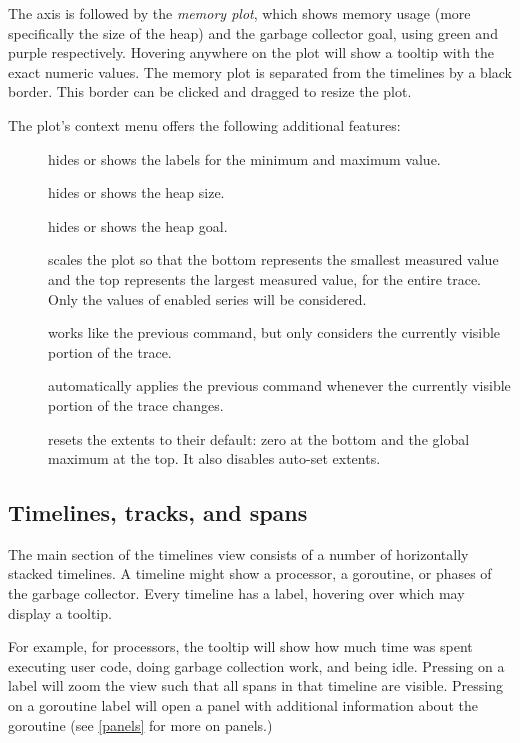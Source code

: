 \documentclass[10pt,letterpaper,oneside,openany,english]{memoir}
\newcommand{\noun}[1]{{\emph{#1}}}
\newcommand{\shortcut}{\ctrl{} or \cmdmac}
\begin{document}
The axis is followed by the \noun{memory plot}, which shows memory usage (more specifically the size of the heap) and the garbage collector goal, using green and purple respectively.
Hovering anywhere on the plot will show a tooltip with the exact numeric values.
The memory plot is separated from the timelines by a black border.
This border can be clicked and dragged to resize the plot.

The plot's context menu offers the following additional features:

\begin{description}
\item[] hides or shows the labels for the minimum and maximum value.
\item[] hides or shows the heap size.
\item[] hides or shows the heap goal.
\item[] scales the plot so that the bottom represents the smallest measured value and the top represents the largest measured value, for the entire trace.
  Only the values of enabled series will be considered.
\item[] works like the previous command, but only considers the currently visible portion of the trace.
\item[] automatically applies the previous command whenever the currently visible portion of the trace changes.
\item[] resets the extents to their default: zero at the bottom and the global maximum at the top.
  It also disables auto-set extents.
\end{description}

\subsection{Timelines, tracks, and spans}
The main section of the timelines view consists of a number of horizontally stacked timelines.
A timeline might show a processor, a goroutine, or phases of the garbage collector.
Every timeline has a label, hovering over which may display a tooltip.

For example, for processors, the tooltip will show how much time was spent executing user code,
doing garbage collection work,
and being idle.
Pressing \keys{\shortcut + LMB} on a label will zoom the view such that all spans in that timeline are visible.
Pressing  on a goroutine label will open a panel with additional information about the goroutine (see \cref{panels} for more on panels.)
\end{document}
